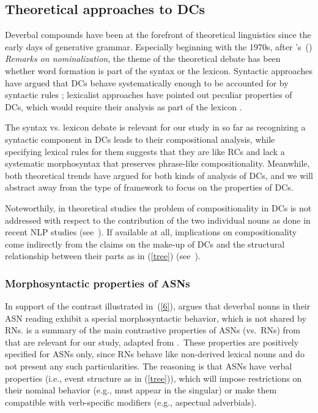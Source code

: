 \documentclass[output=paper]{langsci/langscibook}
\begin{document}
\subsection{Theoretical approaches to DCs}\label{sec:theoretical:lit}
Deverbal compounds have been at the forefront of theoretical linguistics since the early days of generative grammar. Especially beginning with the 1970s, after \citeauthor{chomsky:70}'s~(\citeyear{chomsky:70}) \textit{Remarks on nominalization}, the theme of the theoretical debate has been whether word formation is part of the syntax or the lexicon. Syntactic approaches have argued that DCs behave systematically enough to be accounted for by syntactic rules \citep{roeper:siegel:78,ackema:neeleman:04}; lexicalist approaches have pointed out peculiar properties of DCs, which would require their analysis as part of the lexicon \citep{selkirk:82,lieber:04}. 

The syntax vs. lexicon debate is relevant for our study in so far as recognizing a syntactic component in DCs leads to their compositional analysis, while specifying lexical rules for them suggests that they are like RCs and lack a systematic morphosyntax that preserves phrase-like compositionality. Meanwhile, both theoretical trends have argued for both kinds of analysis of DCs, and we will abstract away from the type of framework to focus on the properties of DCs.


Noteworthily, in theoretical studies the problem of compositionality in DCs is not addressed with respect to the contribution of the two individual nouns as done in recent NLP studies (see~). If available at all, implications on compositionality come indirectly from the claims on the  make-up of DCs and the structural relationship between their  parts as in (\ref{tree}) (see~).

\subsubsection{Morphosyntactic properties of ASNs}\label{sec:properties:ASN}
 In support of the contrast illustrated in~(\ref{6}), \cite{grimshaw:90}  argues that  deverbal nouns in their ASN reading exhibit a special morphosyntactic behavior, which is not shared by RNs.
 is a summary of the main contrastive properties of ASNs (vs.~RNs) from \cite{grimshaw:90} that are relevant for our study, adapted from \citet[3]{alexiadou:grimshaw:08}.\  These properties are positively specified for ASNs only, since RNs behave like non-derived lexical nouns and do not present any such particularities. The reasoning is that ASNs have  verbal properties (i.e., event structure as in (\ref{tree})), which will impose restrictions on their nominal behavior (e.g., must  appear in the singular) or make them compatible with verb-specific modifiers (e.g., aspectual adverbials).
\end{document}
